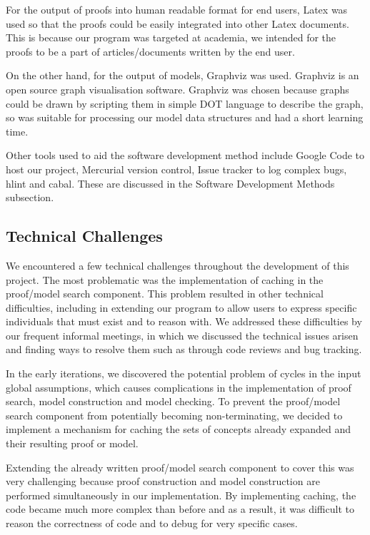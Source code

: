For the output of proofs into human readable format for end users, Latex was used so that the proofs could be easily integrated into other Latex documents. This is because our program was targeted at academia, we intended for the proofs to be a part of articles/documents written by the end user.

On the other hand, for the output of models, Graphviz was used. Graphviz is an open source graph visualisation software. Graphviz was chosen because graphs could be drawn by scripting them in simple DOT language to describe the graph, so was suitable for processing our model data structures and had a short learning time.

Other tools used to aid the software development method include Google Code to host our project, Mercurial version control, Issue tracker to log complex bugs, hlint and cabal. These are discussed in the Software Development Methods subsection.

\subsection{Technical Challenges}

We encountered a few technical challenges throughout the development of this project. The most problematic was the implementation of caching in the proof/model search component. This problem resulted in other technical difficulties, including in extending our program to allow users to express specific individuals that must exist and to reason with. We addressed these difficulties by our frequent informal meetings, in which we discussed the technical issues arisen and finding ways to resolve them such as through code reviews and bug tracking.

In the early iterations, we discovered the potential problem of cycles in the input global assumptions, which causes complications in the implementation of proof search, model construction and model checking. To prevent the proof/model search component from potentially becoming non-terminating, we decided to implement a mechanism for caching the sets of concepts already expanded and their resulting proof or model.

Extending the already written proof/model search component to cover this was very challenging because proof construction and model construction are performed simultaneously in our implementation. By implementing caching, the code became much more complex than before and as a result, it was difficult to reason the correctness of code and to debug for very specific cases.

